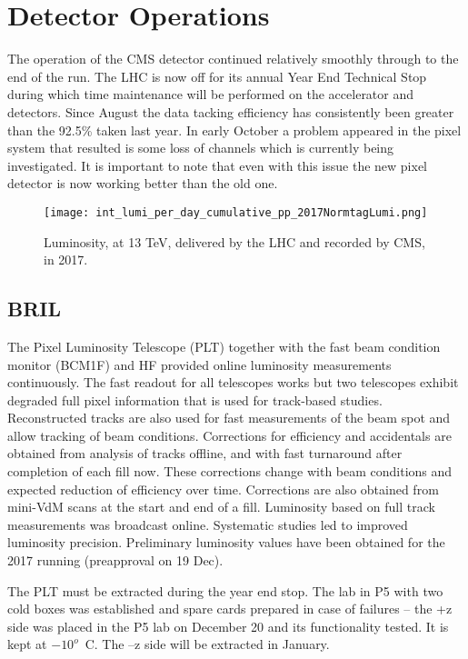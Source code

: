 \documentclass[12pt]{article}
\begin{document}
\section{Detector Operations}
The operation of the CMS detector continued relatively smoothly through to the end of the run. The LHC is now off for its annual Year End Technical Stop during which time maintenance will be performed on the accelerator and detectors. Since August the data tacking efficiency has consistently been greater than the 92.5\% taken last year. In early October a problem appeared in the pixel system that resulted is some loss of channels which is currently being investigated.   It is important to note that even with this issue the new pixel detector is now working better than the old one. 
\begin{figure}
\begin{center}
\texttt{[image: int\_lumi\_per\_day\_cumulative\_pp\_2017NormtagLumi.png]}
\caption{Luminosity, at 13 TeV, delivered by the LHC and recorded by CMS, in 2017.}
\label{fig:Lumi}
\end{center}
\end{figure}

\subsection{BRIL }

The Pixel Luminosity Telescope (PLT) together with the fast beam condition monitor (BCM1F) and HF provided online luminosity measurements continuously. The fast readout for all telescopes works but two telescopes exhibit degraded full pixel information that is used for track-based studies. Reconstructed tracks are also used for fast measurements of the beam spot and allow tracking of beam conditions. Corrections for efficiency and accidentals are obtained from analysis of tracks offline, and with fast turnaround after completion of each fill now. These corrections change with beam conditions and expected reduction of efficiency over time. Corrections are also obtained from mini-VdM scans at the start and end of a fill. Luminosity based on full track measurements was broadcast online. Systematic studies led to improved luminosity precision. Preliminary luminosity values have been obtained for the 2017 running (preapproval on 19 Dec).

The PLT must be extracted during the year end stop. The lab in P5 with two cold boxes was established and spare cards prepared in case of failures – the +z side was placed in the P5 lab on December 20 and its functionality tested. It is kept at $-10^o$~C. The –z side will be extracted in January.
\end{document}
